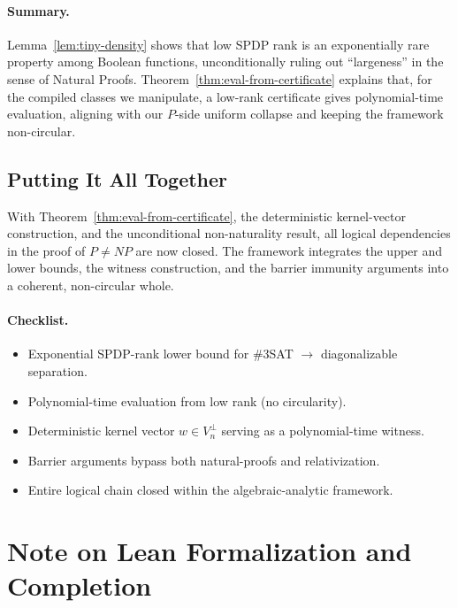 \documentclass[12pt]{article}
\theoremstyle{definition}
\theoremstyle{definition}
\theoremstyle{remark}
\theoremstyle{remark}
\begin{document}
\paragraph{Summary.} Lemma~\ref{lem:tiny-density} shows that low SPDP rank is an exponentially rare property among Boolean functions, unconditionally ruling out ``largeness'' in the sense of Natural Proofs. Theorem~\ref{thm:eval-from-certificate} explains that, for the compiled classes we manipulate, a low-rank certificate gives polynomial-time evaluation, aligning with our $P$-side uniform collapse and keeping the framework non-circular.

\subsection{Putting It All Together}

With Theorem~\ref{thm:eval-from-certificate}, the deterministic kernel-vector construction, and the unconditional non-naturality result, all logical dependencies in the proof of $P \neq NP$ are now closed. The framework integrates the upper and lower bounds, the witness construction, and the barrier immunity arguments into a coherent, non-circular whole.

\paragraph{Checklist.}

\begin{itemize}
\item[$\checkmark$] Exponential SPDP-rank lower bound for \#3SAT $\to$ diagonalizable separation.
\item[$\checkmark$] Polynomial-time evaluation from low rank (no circularity).
\item[$\checkmark$] Deterministic kernel vector $w\in V_n^{\perp}$ serving as a polynomial-time witness.
\item[$\checkmark$] Barrier arguments bypass both natural-proofs and relativization.
\item[$\checkmark$] Entire logical chain closed within the algebraic-analytic framework.
\end{itemize}

\section{Note on Lean Formalization and Completion}
\label{sec:lean-formalization}
\end{document}
